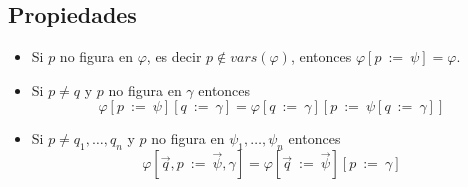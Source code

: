 \documentclass[a4paper]{article}
\begin{document}
\subsection{Propiedades}
\begin{itemize}
    \item Si \(p\) no figura en \(\varphi\), es decir \(p \notin vars\left(\varphi\right)\), entonces
    \(\varphi \left[p \ := \ \psi\right] = \varphi\).
    \item Si \(p \neq q\) y \(p\) no figura en \(\gamma\) entonces
    \[
        \varphi\left[p \ := \ \psi\right]\left[q \ := \ \gamma\right] = \varphi\left[q \ := \ \gamma\right]\left[p \ := \ \psi\left[q \ := \ \gamma\right]\right]
    \]
    \item Si \(p \neq q_{1}, \dotsc, q_{n}\) y \(p\) no figura en \(\psi_{1}, \dotsc, \psi_{n}\) entonces
    \[
        \varphi\left[\vec{q}, p \ := \ \vec{\psi}, \gamma\right] = \varphi\left[\vec{q} \ := \ \vec{\psi}\right]\left[p \ := \ \gamma\right]
    \]
\end{itemize}
\end{document}
